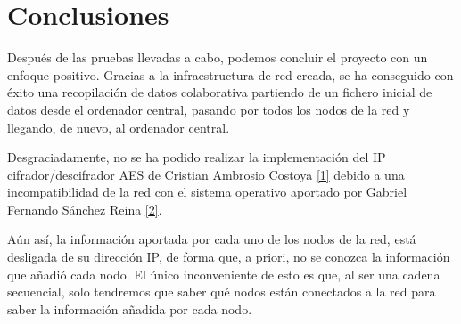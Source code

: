 \section{Conclusiones}
Después de las pruebas llevadas a cabo, podemos concluir el proyecto con un enfoque positivo. Gracias a la infraestructura de red creada, se ha conseguido con éxito una recopilación de datos colaborativa partiendo de un fichero inicial de datos desde el ordenador central, pasando por todos los nodos de la red y llegando, de nuevo, al ordenador central.

Desgraciadamente, no se ha podido realizar la implementación del IP cifrador/descifrador AES de Cristian Ambrosio Costoya \hyperlink{1}{[1]} debido a una incompatibilidad de la red con el sistema operativo aportado por Gabriel Fernando Sánchez Reina \hyperlink{2}{[2]}.

Aún así, la información aportada por cada uno de los nodos de la red, está desligada de su dirección IP, de forma que, a priori, no se conozca la información que añadió cada nodo. El único inconveniente de esto es que, al ser una cadena secuencial, solo tendremos que saber qué nodos están conectados a la red para saber la información añadida por cada nodo.

